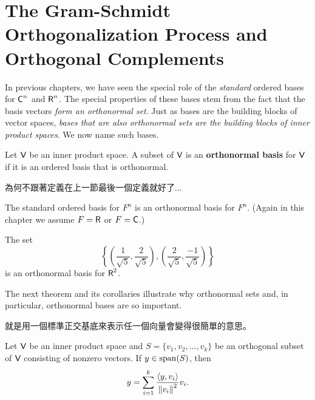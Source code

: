 \section{The Gram-Schmidt Orthogonalization Process and Orthogonal Complements} \label{sec 6.2}

In previous chapters, we have seen the special role of the \emph{standard} ordered bases for \(\textsf{C}^n\) and \(\textsf{R}^n\).
The special properties of these bases stem from the fact that the basis vectors \emph{form an orthonormal set}.
Just as bases are the building blocks of vector spaces, \emph{bases that are also orthonormal sets are the building blocks of inner product spaces}.
We now name such bases.

\begin{definition} \label{def 6.5}
Let \(\textsf{V}\) be an inner product space.
A subset of \(\textsf{V}\) is an \textbf{orthonormal basis} for \(\textsf{V}\) if it is an ordered basis that is orthonormal.
\end{definition}

\begin{note}
為何不跟著定義在上一節最後一個定義就好了...
\end{note}

\begin{example} \label{example 6.2.1}
The standard ordered basis for \(F^n\) is an orthonormal basis for \(F^n\).
(Again in this chapter we assume \(F = \textsf{R}\) or \(F = \textsf{C}\).)
\end{example}

\begin{example} \label{example 6.2.2}
The set
\[
    \left\{ \left( \frac{1}{\sqrt{5}}, \frac{2}{\sqrt{5}} \right), \left( \frac{2}{\sqrt{5}}, \frac{-1}{\sqrt{5}} \right) \right\}
\]
is an orthonormal basis for \(\textsf{R}^2\).
\end{example}

The next theorem and its corollaries illustrate why orthonormal sets and, in particular, orthonormal bases are so important.

\begin{note}
就是用一個標準正交基底來表示任一個向量會變得很簡單的意思。
\end{note}

\begin{theorem} \label{thm 6.3}
Let \(\textsf{V}\) be an inner product space and \(S = \{ v_1, v_2, ..., v_k \}\) be an orthogonal subset of \(\textsf{V}\) consisting of nonzero vectors.
If \(y \in \operatorname{span}(S)\), then
\[
    y = \sum_{i = 1}^k \frac{\left< y, v_i \right>}{\left\lVert v_i\right\rVert^2} v_i.
\]
\end{theorem}

